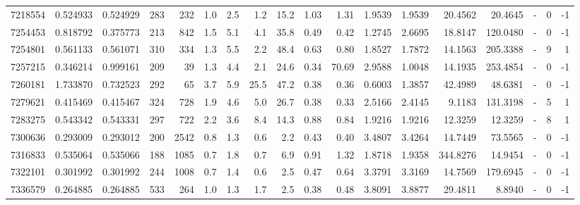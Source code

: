 \begin{tabular}{rrrrrrrrrrrrrrrlrr}
   7218554 & 0.524933 &   0.524929 &  283 &  232 &      1.0 &      2.5 &     1.2 &     15.2 &       1.03 &        1.31 &  1.9539 &  1.9539 &   20.4562 &   20.4645 &             - &        0 &         -1 \\
   7254453 & 0.818792 &   0.375773 &  213 &  842 &      1.5 &      5.1 &     4.1 &     35.8 &       0.49 &        0.42 &  1.2745 &  2.6695 &   18.8147 &  120.0480 &             - &        0 &         -1 \\
   7254801 & 0.561133 &   0.561071 &  310 &  334 &      1.3 &      5.5 &     2.2 &     48.4 &       0.63 &        0.80 &  1.8527 &  1.7872 &   14.1563 &  205.3388 &             - &        9 &          1 \\
   7257215 & 0.346214 &   0.999161 &  209 &   39 &      1.3 &      4.4 &     2.1 &     24.6 &       0.34 &       70.69 &  2.9588 &  1.0048 &   14.1935 &  253.4854 &             - &        0 &         -1 \\
   7260181 & 1.733870 &   0.732523 &  292 &   65 &      3.7 &      5.9 &    25.5 &     47.2 &       0.38 &        0.36 &  0.6003 &  1.3857 &   42.4989 &   48.6381 &             - &        0 &         -1 \\
   7279621 & 0.415469 &   0.415467 &  324 &  728 &      1.9 &      4.6 &     5.0 &     26.7 &       0.38 &        0.33 &  2.5166 &  2.4145 &    9.1183 &  131.3198 &             - &        5 &          1 \\
   7283275 & 0.543342 &   0.543331 &  297 &  722 &      2.2 &      3.6 &     8.4 &     14.3 &       0.88 &        0.84 &  1.9216 &  1.9216 &   12.3259 &   12.3259 &             - &        8 &          1 \\
   7300636 & 0.293009 &   0.293012 &  200 & 2542 &      0.8 &      1.3 &     0.6 &      2.2 &       0.43 &        0.40 &  3.4807 &  3.4264 &   14.7449 &   73.5565 &             - &        0 &         -1 \\
   7316833 & 0.535064 &   0.535066 &  188 & 1085 &      0.7 &      1.8 &     0.7 &      6.9 &       0.91 &        1.32 &  1.8718 &  1.9358 &  344.8276 &   14.9454 &             - &        0 &         -1 \\
   7322101 & 0.301992 &   0.301992 &  244 & 1008 &      0.7 &      1.4 &     0.6 &      2.5 &       0.47 &        0.64 &  3.3791 &  3.3169 &   14.7569 &  179.6945 &             - &        0 &         -1 \\
   7336579 & 0.264885 &   0.264885 &  533 &  264 &      1.0 &      1.3 &     1.7 &      2.5 &       0.38 &        0.48 &  3.8091 &  3.8877 &   29.4811 &    8.8940 &             - &        0 &         -1 \\

\end{tabular}
